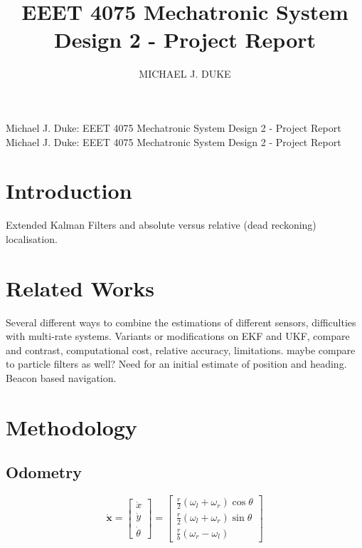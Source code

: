 \documentclass{ieeeaccess}
\begin{document}

\title{EEET 4075 Mechatronic System Design 2 - Project Report}
\author{\uppercase{Michael J. Duke}}
\address[1]{University of South Australia, Mawson Lakes, SA 5095 Australia (e-mail: dukmj002@mymail.unisa.edu.au)}

\markboth
{Michael J. Duke: EEET 4075 Mechatronic System Design 2 - Project Report}
{Michael J. Duke: EEET 4075 Mechatronic System Design 2 - Project Report}

\titlepgskip=-15pt

\maketitle

\section{Introduction}
\label{sec:introduction}
 Extended Kalman Filters and absolute versus relative (dead reckoning) localisation.

\section{Related Works}
\label{sec:rel}
Several different ways to combine the estimations of different sensors, difficulties with multi-rate systems. Variants or modifications on EKF and UKF, compare and contrast, computational cost, relative accuracy, limitations. maybe compare to particle filters as well? Need for an initial estimate of position and heading. Beacon based navigation.

\section{Methodology}
\label{sec:meth}
	
\subsection{Odometry}

	\begin{equation}
	\label{eq:xvec1}
		\dot{\boldsymbol{x}} = 
		\begin{bmatrix}
			\dot{x}		\\
			\dot{y}		\\
			\dot{\theta}
		\end{bmatrix}
		=
		\begin{bmatrix}
			\frac{r}{2}\left(\omega_{l} + \omega_{r}\right)\cos{\theta}	\\
			\frac{r}{2}\left(\omega_{l} + \omega_{r}\right)\sin{\theta}	\\
			\frac{r}{b}\left(\omega_{r} - \omega_{l}\right)
		\end{bmatrix}
	\end{equation}
\end{document}
